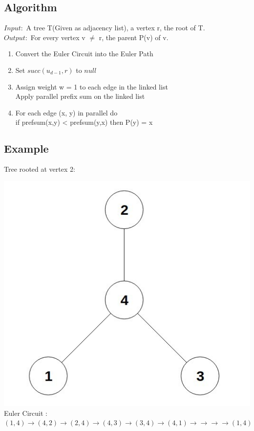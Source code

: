 \documentclass[twoside]{article}
\begin{document}
\subsection{Algorithm}
$Input: $ A tree T(Given as adjacency list), a vertex r, the root of T.\\
$Output: $ For every vertex v $\neq$ r, the parent P(v) of v.

\begin{enumerate}
\item Convert the Euler Circuit into the Euler Path
\item Set $succ(u_{d-1}, r)$ to $null$
\item Assign weight w = 1 to each edge in the linked list\\
Apply parallel prefix sum on the linked list
\item For each edge (x, y) in parallel do \\
if prefsum(x,y) < prefsum(y,x) then P(y) = x
\end{enumerate}

\subsection{Example}
Tree rooted at vertex 2:

\begin{center}
\includegraphics[scale=0.25]{g2} \\
Euler Circuit : $(1,4)\to(4,2)\to(2,4)\to(4,3)\to(3,4)\to(4,1)\to\to\to\to(1,4)$
\end{center}
\end{document}

